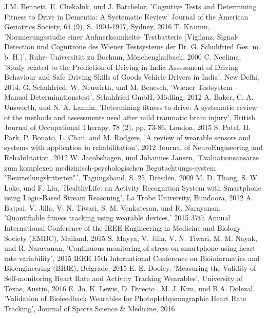 \documentclass[conference]{IEEEtran}
\begin{document}
\begin{thebibliography}{00}
J.M. Bennett, E. Chekaluk, und J. Batchelor,
'Cognitive Tests and Determining Fitness to Drive in Dementia: A Systematic Review'
Journal of the American Geriatrics Society, 64 (9), S. 1904-1917, Sydney, 2016
 T. Kramm, 'Normierungsstudie einer Aufmerksamkeits- Testbatterie (Vigilanz, Signal- Detection und Cognitrone des Wiener Testsystems der Dr. G. Schuhfried Ges. m. b. H.)', Ruhr- Universität zu Bochum, Mönchengladbach, 2000
 C. Neelima, 'Study related to the Prediction of Driving in India Assessment of Driving Behaviour and Safe Driving Skills of Goods Vehicle Drivers in India', New Delhi, 2014. 
 G. Schuhfried, W. Neuwirth, und M. Benesch, 'Wiener Testsystem - Manual Determinationstest', Schuhfried GmbH, Mödling, 2012
A. Baker, C. A. Unsworth, und N. A. Lannin,
'Determining fitness to drive: A systematic review of the methods and assessments used after mild traumatic brain injury', British Journal of Occupational Therapy, 78 (2), pp. 73-86, London, 2015
 S. Patel, H. Park, P. Bonato, L. Chan, and M. Rodgers, 'A review of wearable sensors and systems with application in rehabilitation', 2012 Journal of NeuroEngineering and Rehabilitation, 2012
 W. Jacobshagen, und Johannes Jansen, 'Evaluationsansätze zum komplexen medizinisch-psychologischen Begutachtungs-system "Beurteilungskriterien".', Tagungsband, S. 25, Dresden, 2009
 M. D. Thang, S. W. Loke, und F. Liu, 'HealthyLife: an Activity Recognition System with Smartphone using Logic-Based Stream Reasoning',  La Trobe University, Bundoora, 2012
  A. Bajpai, V. Jilla, V. N. Tiwari, S. M. Venkatesan, und R. Narayanan, 'Quantifiable fitness tracking using wearable devices,' 2015 37th Annual International Conference of the IEEE Engineering in Medicine and Biology Society (EMBC), Mailand, 2015
 S. Mayya, V. Jilla, V. N. Tiwari, M. M. Nayak, und R. Narayanan, 'Continuous monitoring of stress on smartphone using heart rate variability', 2015 IEEE 15th International Conference on Bioinformatics and Bioengineering (BIBE), Belgrade, 2015
 E. E. Dooley, 'Measuring the Validity of Self-monitoring Heart Rate and Activity Tracking Wearables', University of Texas, Austin, 2016
 E. Jo, K. Lewis, D. Directo , M. J.  Kim, und B.A. Dolezal. 'Validation of Biofeedback Wearables for Photoplethysmographic Heart Rate Tracking', Journal of Sports Science \& Medicine, 2016

\end{thebibliography}
\end{document}
